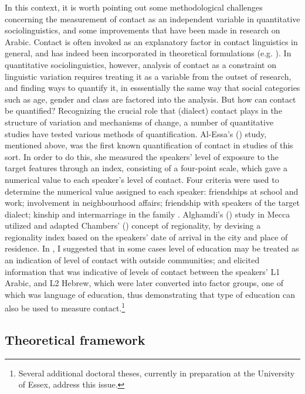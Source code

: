 \documentclass[output=paper]{langsci/langscibook}
\begin{document}
In this context, it is worth pointing out some methodological challenges concerning the measurement of contact as an independent variable in quantitative sociolinguistics, and some improvements that have been made in research on Arabic. Contact is often invoked as an explanatory factor in contact linguistics in general, and has indeed been incorporated in theoretical formulations (e.g. \citealt{ThomasonKaufman1988}). In quantitative sociolinguistics, however, analysis of contact as a constraint on linguistic variation requires treating it as a variable from the outset of research, and finding ways to quantify it, in esssentially the same way that social categories such as age, gender and class are factored into the analysis. But how can contact be quantified? Recognizing the crucial role that (dialect) contact plays in the structure of variation and mechanisms of change, a number of quantitative studies have tested various methods of quantification. Al-Essa's (\citeyear{Al-Essa2009}) study, mentioned above, was the first known quantification of contact in studies of this sort. In order to do this, she measured the speakers’ level of exposure to the target features through an index, consisting of a four-point scale, which gave a numerical value to each speaker’s level of contact. Four criteria were used to determine the numerical value assigned to each speaker: friendships at school and work; involvement in neighbourhood affairs; friendship with speakers of the target dialect; kinship and intermarriage in the family \citep[208]{Al-Essa2009}. Alghamdi's (\citeyear{Alghamdi2014}) study in Mecca utilized and adapted Chambers' (\citeyear{Chambers2000}) concept of regionality, by devising a regionality index based on the speakers’ date of arrival in the city and place of residence. In \citet{Al-Wer2002}, I suggested that in some cases level of education may be treated as an indication of level of contact with outside communities; and \citet{Horesh2014} elicited information that was indicative of levels of contact between the speakers’ L1 Arabic, and L2 Hebrew, which were later converted into factor groups, one of which was language of education, thus demonstrating that type of education can also be used to measure contact.\footnote{Several additional doctoral theses, currently in preparation at the University of Essex, address this issue.}

\subsection{Theoretical framework}
\end{document}
